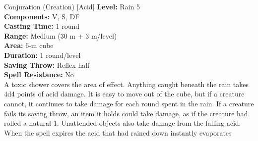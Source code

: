 {Conjuration (Creation) [Acid]}
{
	\textbf{Level:}
	Rain 5\\
	\textbf{Components:}
	V, S, DF\\
	\textbf{Casting Time:}
	1 round\\
	\textbf{Range:}
	Medium (30 m + 3 m/level)\\
	\textbf{Area:}
	6-m cube\\
	\textbf{Duration:}
	1 round/level\\
	\textbf{Saving Throw:}
	Reflex half\\
	\textbf{Spell Resistance:}
	No\\
}
{
	A toxic shower covers the area of effect. Anything caught beneath the rain takes 4d4 points of acid damage. It is easy to move out of the cube, but if a creature cannot, it continues to take damage for each round spent in the rain. If a creature fails its saving throw, an item it holds could take damage, as if the creature had rolled a natural 1. Unattended objects also take damage from the falling acid. When the spell expires the acid that had rained down instantly evaporates
}
